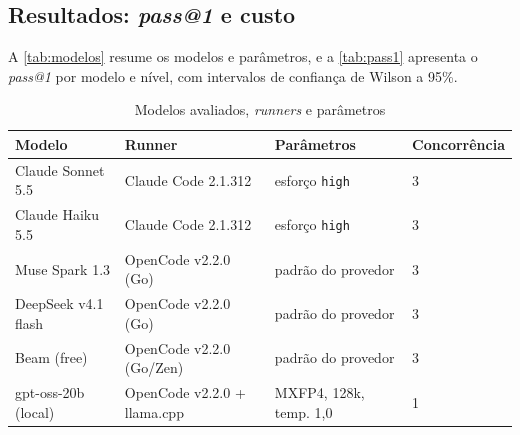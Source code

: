 \subsection{Resultados: \textit{pass@1} e custo}
\label{sec:resultados-pass}

A
\autoref{tab:modelos} resume os modelos e parâmetros, e a \autoref{tab:pass1}
apresenta o \textit{pass@1} por modelo e nível, com intervalos de confiança de
Wilson a 95\%.

\begin{table}[htb]
    \centering
    \ABNTEXfontereduzida
    \caption{Modelos avaliados, \textit{runners} e parâmetros}
    \label{tab:modelos}
    \begin{tabular}{llll}
        \toprule
        \textbf{Modelo} & \textbf{Runner} & \textbf{Parâmetros} & \textbf{Concorrência} \\
        \midrule
        Claude Sonnet 5.5 & Claude Code 2.1.312 & esforço \texttt{high} & 3 \\
        Claude Haiku 5.5 & Claude Code 2.1.312 & esforço \texttt{high} & 3 \\
        Muse Spark 1.3 & OpenCode v2.2.0 (Go) & padrão do provedor & 3 \\
        DeepSeek v4.1 flash & OpenCode v2.2.0 (Go) & padrão do provedor & 3 \\
        Beam (free) & OpenCode v2.2.0 (Go/Zen) & padrão do provedor & 3 \\
        gpt-oss-20b (local) & OpenCode v2.2.0 + llama.cpp & MXFP4, 128k, temp. 1,0 & 1 \\
        \bottomrule
    \end{tabular}
    \fonteautor
\end{table}

